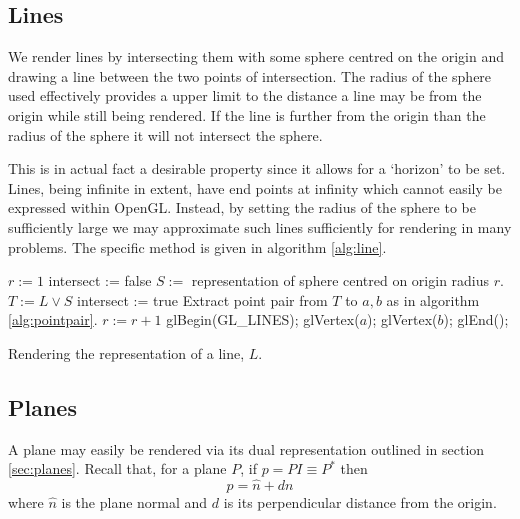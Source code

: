 \subsection{Lines}

We render lines by intersecting them with some sphere centred on the origin
and drawing a line between the two points of intersection. The radius of the
sphere used effectively provides a upper limit to the distance a line may be
from the origin while still being rendered. If the line is further from the 
origin than the radius of the sphere it will not intersect the sphere.

This is in actual fact a desirable property since it allows for a `horizon' to
be set. Lines, being infinite in extent, have end points at infinity which
cannot easily be expressed within OpenGL. Instead, by setting the radius of the sphere
to be sufficiently large we may approximate such lines sufficiently for rendering
in many problems. The specific method is given in algorithm \ref{alg:line}.

\begin{fancyalg}
\begin{algorithmic}[1]
\STATE $r := 1$
\REPEAT
\STATE intersect := false
\STATE $S := $ representation of sphere centred on origin radius $r$.
\STATE $T := L \vee S$
\STATE intersect := true
\STATE Extract point pair from $T$ to $a,b$ as in algorithm \ref{alg:pointpair}.
\ENDIF
\STATE $r := r+1$
\STATE glBegin(GL\_LINES);
\STATE glVertex($a$); glVertex($b$);
\STATE glEnd();
\ENDIF
\end{algorithmic}
\caption{\label{alg:line}Rendering the representation of a line, $L$.}
\end{fancyalg}

%

\subsection{Planes}

A plane may easily be rendered via its dual representation outlined
in section \ref{sec:planes}. Recall that, for a plane $P$, if $p = PI \equiv P^*$ then
\[
p = \hat{n} + dn
\]
where $\hat{n}$ is the plane normal and $d$ is its perpendicular distance from the origin.

